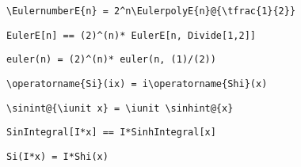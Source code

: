 \newsavebox\APST
\begin{lrbox}{\APST}
 \begin{minipage}[t]{0.82\textwidth}
  \lstinline[language={[latex]TeX},mathescape,breaklines=true]"\EulernumberE{n} = 2^n\EulerpolyE{n}@{\tfrac{1}{2}}"
 \end{minipage}
\end{lrbox}
\newsavebox\APMM
\begin{lrbox}{\APMM}
 \begin{minipage}[t]{0.82\textwidth}
  \lstinline[language={[latex]TeX},mathescape,breaklines=true]"EulerE[n] == (2)^(n)* EulerE[n, Divide[1,2]]"
 \end{minipage}
\end{lrbox}
\newsavebox\APMA
\begin{lrbox}{\APMA}
 \begin{minipage}[t]{0.82\textwidth}
  \lstinline[language={[latex]TeX},mathescape,breaklines=true]"euler(n) = (2)^(n)* euler(n, (1)/(2))"
 \end{minipage}
\end{lrbox}
\newsavebox\AQT
\begin{lrbox}{\AQT}
 \begin{minipage}[t]{0.82\textwidth}
  \lstinline[language={[latex]TeX},mathescape,breaklines=true]"\operatorname{Si}(ix) = i\operatorname{Shi}(x)"
 \end{minipage}
\end{lrbox}
\newsavebox\AQST
\begin{lrbox}{\AQST}
 \begin{minipage}[t]{0.82\textwidth}
  \lstinline[language={[latex]TeX},mathescape,breaklines=true]"\sinint@{\iunit x} = \iunit \sinhint@{x}"
 \end{minipage}
\end{lrbox}
\newsavebox\AQMM
\begin{lrbox}{\AQMM}
 \begin{minipage}[t]{0.82\textwidth}
  \lstinline[language={[latex]TeX},mathescape,breaklines=true]"SinIntegral[I*x] == I*SinhIntegral[x]"
 \end{minipage}
\end{lrbox}
\newsavebox\AQMA
\begin{lrbox}{\AQMA}
 \begin{minipage}[t]{0.82\textwidth}
  \lstinline[language={[latex]TeX},mathescape,breaklines=true]"Si(I*x) = I*Shi(x)"
 \end{minipage}
\end{lrbox}
